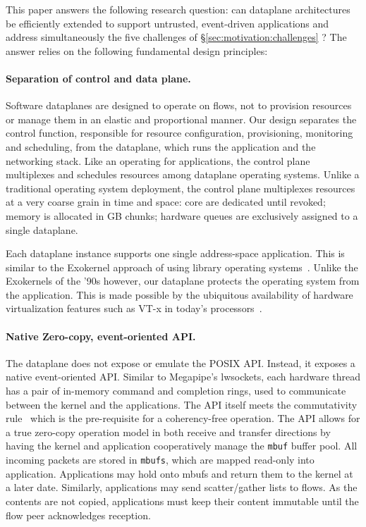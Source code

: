 This paper answers the following research question: can dataplane
architectures be efficiently extended to support untrusted,
event-driven applications and address simultaneously the five
challenges of \S\ref{sec:motivation:challenges} ?  The answer relies
on the following fundamental design principles:


\paragraph{Separation of control and data plane.}

Software dataplanes are designed to operate on flows, not to provision
resources or manage them in an elastic and proportional manner.  Our
design separates the control function, responsible for resource
configuration, provisioning, monitoring and scheduling, from the
dataplane, which runs the application and the networking stack.  Like
an operating for applications, the control plane multiplexes and
schedules resources among dataplane operating systems.  Unlike a traditional operating system
deployment, the control plane multiplexes resources at a very coarse
grain in time and space: core are dedicated until revoked; memory is
allocated in GB chunks; hardware queues are exclusively assigned to a
single dataplane.

Each dataplane instance supports one single address-space
application.  This is similar to the Exokernel approach of using
library operating systems~\cite{DBLP:conf/sosp/EnglerKO95}.  Unlike
the Exokernels of the '90s however, our dataplane protects the
operating system from the application.  This is made possible by the
ubiquitous availability of hardware virtualization features such as
VT-x in today's
processors~\cite{DBLP:journals/computer/UhligNRSMABKLS05}.


\paragraph{Native Zero-copy, event-oriented API.}

The dataplane does not expose or emulate the POSIX API.  Instead, it
exposes a native event-oriented API.  Similar to Megapipe's lwsockets,
each hardware thread has a pair of in-memory command and completion
rings, used to communicate between the kernel and the applications.
The API itself meets the commutativity
rule~\cite{DBLP:conf/sosp/ClementsKZMK13} which is the pre-requisite
for a coherency-free operation.  The API allows for a true zero-copy
operation model in both receive and transfer directions by having the
kernel and application cooperatively manage the \texttt{mbuf} buffer
pool.  All incoming packets are stored in \texttt{mbufs}, which are
mapped read-only into application.  Applications may hold onto mbufs
and return them to the kernel at a later date.  Similarly,
applications may send scatter/gather lists to flows. As the contents
are not copied, applications must keep their content immutable until
the flow peer acknowledges reception.

